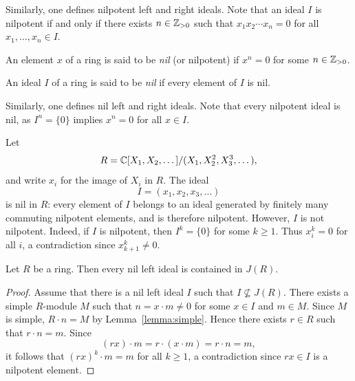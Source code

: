 Similarly, one defines nilpotent left and right ideals. 
Note that an ideal $I$ is nilpotent if and only if there exists $n\in\mathbb{Z}_{>0}$ such that 
$x_1x_2\cdots x_n=0$ for all $x_1,\dots,x_n\in I$.  

\begin{definition}
	An element $x$ of a ring is said to be \emph{nil} (or nilpotent) if $x^n=0$ for some $n\in\mathbb{Z}_{>0}$. 
\end{definition}

\begin{definition}
An ideal $I$ of a ring is said to be \emph{nil} if every element of $I$ is nil. 
\end{definition}

Similarly, one defines nil left and right ideals. 
Note that every nilpotent ideal is nil, as $I^n=\{0\}$ implies $x^n=0$ for all 
$x\in I$.

\begin{example}
	Let \[
 R=\mathbb{C}[X_1,X_2,\dots]/(X_1,X_2^2,X_3^3,\dots), 
    \]
    and write $x_i$ for the image of $X_i$ in $R$. The ideal
    \[
    I=(x_1,x_2,x_3,\dots)
    \]
    is nil in $R$: every element of $I$ belongs to an ideal generated by
    finitely many commuting nilpotent elements, and is therefore nilpotent.
    However, $I$ is not nilpotent. Indeed, if $I$ is nilpotent, then 
    $I^k=\{0\}$ for some $k\geq1$. Thus $x_i^k=0$ for
    all $i$, a contradiction since $x_{k+1}^k\ne0$.
\end{example}

\begin{proposition}
	\label{pro:nilJ}
	Let $R$ be a ring. Then every nil left ideal is contained in $J(R)$.
\end{proposition}

\begin{proof}
	Assume that there is a nil left ideal $I$ such that 
	$I\not\subseteq J(R)$. There exists a simple $R$-module $M$ such that 
	$n=x\cdot m\ne 0$ for some $x\in I$ and $m\in M$. Since $M$ is simple,
    $R\cdot n=M$ by Lemma~\ref{lemma:simple}. Hence there exists $r\in R$ such that $r\cdot n=m$. Since
	\[
	(rx)\cdot m=r\cdot (x\cdot m)=r\cdot n=m, 
	\]
	it follows that $(rx)^k\cdot m=m$ 
    for all 
	$k\geq1$, a contradiction since $rx\in I$ is a nilpotent element. 
\end{proof}

